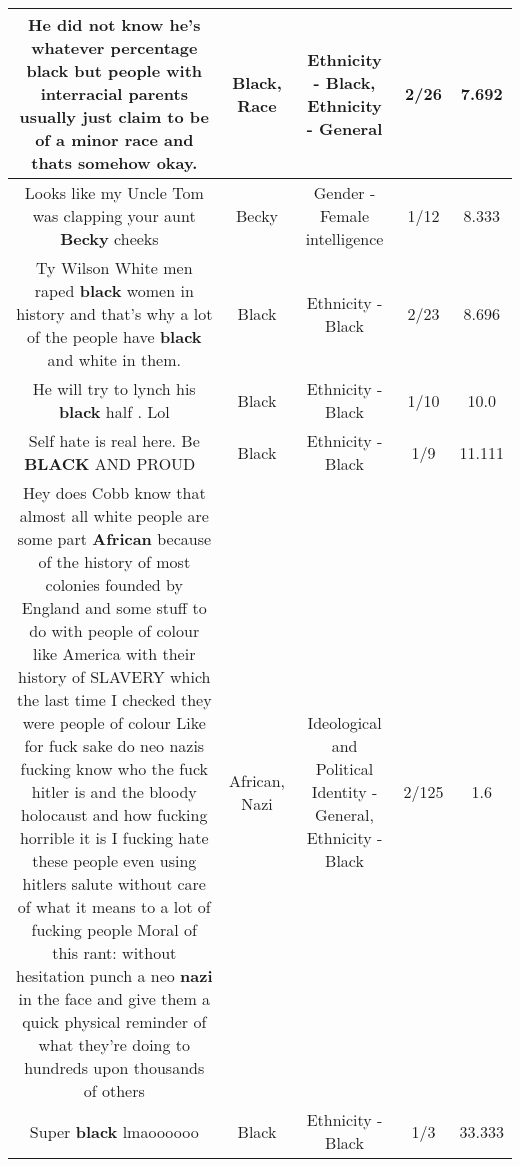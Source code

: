 \documentclass[11pt]{article}
\newlength\mylength
\begin{document}
\begin{center}
\begin{longtable}{|C{.65\mylength}|C{.30\mylength}|C{.12\mylength}|C{.12\mylength}|C{.12\mylength}|}
  \small He did not know he's whatever percentage \textbf{black} but people with interracial parents usually just claim to be of a minor \textbf{race} and thats somehow okay.\normalsize   & Black, Race & Ethnicity - Black, Ethnicity - General & 2/26 & 7.692 \\  \hline
  \small Looks like my Uncle Tom was clapping your aunt \textbf{Becky} cheeks  🤣\normalsize   & Becky & Gender - Female intelligence & 1/12 & 8.333 \\  \hline
  \small Ty Wilson  White men raped \textbf{black} women in history and that's why a lot of the people have \textbf{black} and white in them.\normalsize   & Black & Ethnicity - Black & 2/23 & 8.696 \\  \hline
  \small He will try to lynch his \textbf{black} half . Lol\normalsize   & Black & Ethnicity - Black & 1/10 & 10.0 \\  \hline
  \small Self hate is real here. Be \textbf{BLACK} AND PROUD✊🏽\normalsize   & Black & Ethnicity - Black & 1/9 & 11.111 \\  \hline
  \small Hey does Cobb know that almost all white people are some part \textbf{African} because of the history of most colonies founded by England and some stuff to do with people of colour like America with their history of SLAVERY which the last time I checked they were people of colour Like for fuck sake do neo nazis fucking know who the fuck hitler is and the bloody holocaust and how fucking horrible it is I fucking hate these people even using hitlers salute without care of what it means to a lot of fucking people Moral of this rant: without hesitation punch a neo \textbf{nazi} in the face and give them a quick physical reminder of what they're doing to hundreds upon thousands of others\normalsize   & African, Nazi &  Ideological and Political Identity - General, Ethnicity - Black & 2/125 & 1.6 \\  \hline
  \small Super \textbf{black} lmaoooooo\normalsize   & Black & Ethnicity - Black & 1/3 & 33.333 \\  \hline

\end{longtable}
\end{center}
\end{document}

